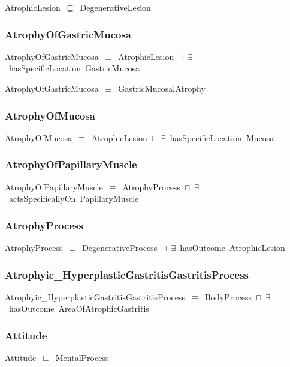 \documentclass{article}
\begin{document}
AtrophicLesion~\ensuremath{\sqsubseteq}~DegenerativeLesion~

\subsubsection*{AtrophyOfGastricMucosa}

AtrophyOfGastricMucosa~\ensuremath{\equiv}~AtrophicLesion~\ensuremath{\sqcap}~\ensuremath{\exists}~hasSpecificLocation~GastricMucosa

AtrophyOfGastricMucosa~\ensuremath{\equiv}~GastricMucosalAtrophy

\subsubsection*{AtrophyOfMucosa}

AtrophyOfMucosa~\ensuremath{\equiv}~AtrophicLesion~\ensuremath{\sqcap}~\ensuremath{\exists}~hasSpecificLocation~Mucosa

\subsubsection*{AtrophyOfPapillaryMuscle}

AtrophyOfPapillaryMuscle~\ensuremath{\equiv}~AtrophyProcess~\ensuremath{\sqcap}~\ensuremath{\exists}~actsSpecificallyOn~PapillaryMuscle

\subsubsection*{AtrophyProcess}

AtrophyProcess~\ensuremath{\equiv}~DegenerativeProcess~\ensuremath{\sqcap}~\ensuremath{\exists}~hasOutcome~AtrophicLesion

\subsubsection*{Atrophyic_HyperplasticGastritisGastritisProcess}

Atrophyic\_HyperplasticGastritisGastritisProcess~\ensuremath{\equiv}~BodyProcess~\ensuremath{\sqcap}~\ensuremath{\exists}~hasOutcome~AreaOfAtrophicGastritis

\subsubsection*{Attitude}

Attitude~\ensuremath{\sqsubseteq}~MentalProcess~
\end{document}
